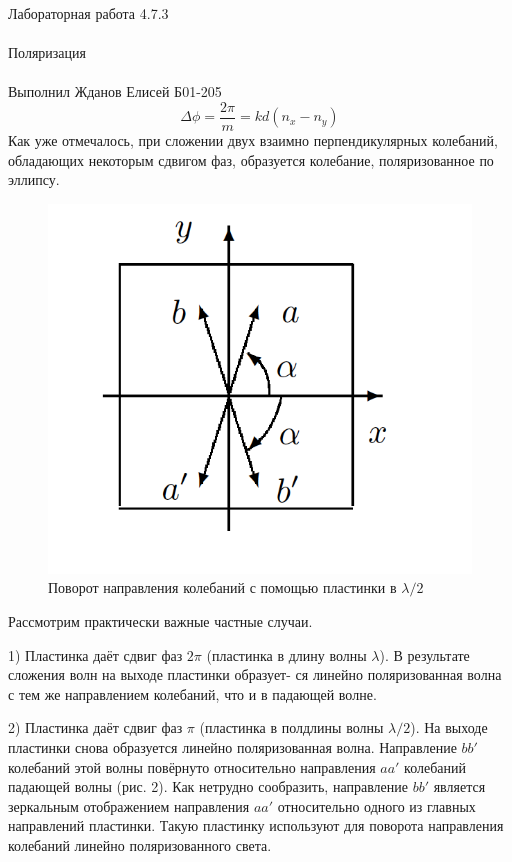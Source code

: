 \documentclass{astroedu-lab}
\begin{document}
\begin{problem}{\huge Лабораторная работа 4.7.3\\\\Поляризация\\\\Выполнил Жданов Елисей Б01-205}
\begin{equation}\label{}
\Delta \phi =  \dfrac{2\pi}{m} = k d(n_x - n_y)
\end{equation}
Как уже отмечалось, при сложении двух взаимно перпендикулярных колебаний, обладающих некоторым сдвигом фаз, образуется колебание, поляризованное по эллипсу.

\newpage

\begin{figure}
	\includegraphics[width=\linewidth]{2}
	\caption{Поворот направления колебаний с помощью пластинки в $ \lambda / 2 $}
	\label{ris 2}
\end{figure}


Рассмотрим практически важные частные случаи.

 		
1) Пластинка даёт сдвиг фаз $ 2\pi $ (пластинка в длину волны $ \lambda $). В результате сложения волн на выходе пластинки образует-
ся линейно поляризованная волна с тем же направлением колебаний, что и в падающей волне.

2) Пластинка даёт сдвиг фаз $ \pi $ (пластинка в полдлины волны $ \lambda / 2 $). На выходе пластинки снова образуется линейно поляризованная волна. Направление $ bb' $ колебаний этой волны повёрнуто относительно направления $ aa' $ колебаний падающей волны (рис. 2). Как нетрудно сообразить, направление $ bb' $ является зеркальным отображением направления $ aa' $ относительно одного из главных направлений пластинки. Такую пластинку используют для поворота направления колебаний линейно поляризованного света.


\end{problem}
\end{document}
